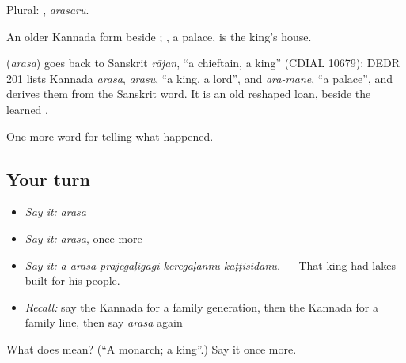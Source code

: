 Plural: , \emph{arasaru}.

An older Kannada form beside ; , a palace, is the king's house.

\begin{cousinweb}
\textbf{} (\emph{arasa}) goes back to Sanskrit \emph{rājan}, \textquotedblleft{}a chieftain, a king\textquotedblright{} (CDIAL 10679): DEDR 201 lists Kannada \emph{arasa}, \emph{arasu}, \textquotedblleft{}a king, a lord\textquotedblright{}, and \emph{ara-mane}, \textquotedblleft{}a palace\textquotedblright{}, and derives them from the Sanskrit word. It is an old reshaped loan, beside the learned .
\end{cousinweb}

\begin{grammarlens}[title={What you've built}]
One more word for telling what happened.
\end{grammarlens}

\subsection*{Your turn}
\begin{itemize}
\raggedright
  \item \emph{Say it:} \emph{arasa}
  \item \emph{Say it:} \emph{arasa}, once more
  \item \emph{Say it:} \emph{ā arasa prajegaḷigāgi keregaḷannu kaṭṭisidanu.} — That king had lakes built for his people.
  \item \emph{Recall:} say the Kannada for a family generation, then the Kannada for a family line, then say \emph{arasa} again
\end{itemize}

\begin{tcolorbox}[breakable,colback=teal!4,colframe=teal!35!black,title={Before you move on}]
What does  mean? (\textquotedblleft{}A monarch; a king\textquotedblright{}.) Say it once more.
\end{tcolorbox}
